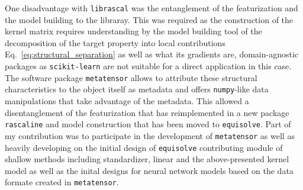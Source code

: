 One disadvantage with \texttt{librascal} was the entanglement of the featurization and the model building to the libraray.
This was required as the construction of the kernel matrix requires understanding by the model building tool of the decomposition of the target property into local contributions Eq.~\ref{eq:structural_separation} as well as what its gradients are, domain-agnostic packages as \texttt{scikit-learn} are not suitable for a direct application in this case.
The software package \texttt{metatensor} allows to attribute these structural characteristics to the object itself as metadata and offers \texttt{numpy}-like data manipulations that take advantage of the metadata.
This allowed a disentanglement of the featurization that has reimplemented in a new package \texttt{rascaline} and model construction that has been moved to \texttt{equisolve}.
Part of my contribution was to participate in the development of \texttt{metatensor} as well as heavily developing on the initial design of \texttt{equisolve} contributing module of shallow methods including standardizer, linear and the above-presented kernel model as well as the inital designs for neural network models based on the data formate created in \texttt{metatensor}.



